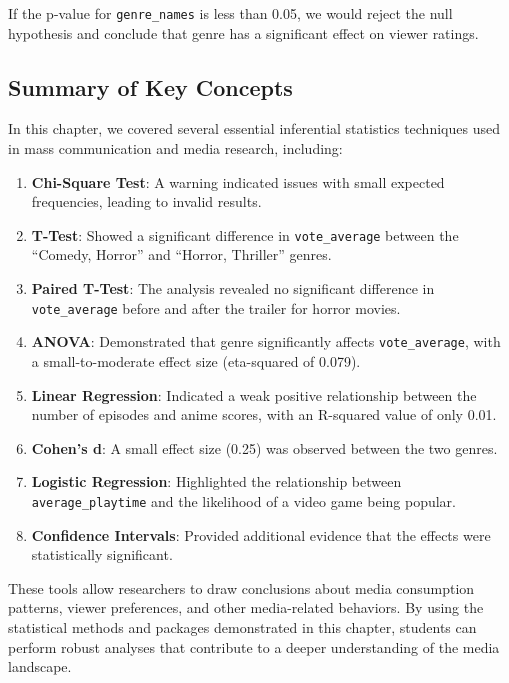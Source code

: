 \documentclass[
]{book}
\providecommand{\tightlist}{%
  \setlength{\itemsep}{0pt}\setlength{\parskip}{0pt}}
\begin{document}
If the p-value for \texttt{genre\_names} is less than 0.05, we would reject the null hypothesis and conclude that genre has a significant effect on viewer ratings.

\subsection*{Summary of Key Concepts}\label{summary-of-key-concepts}

In this chapter, we covered several essential inferential statistics techniques used in mass communication and media research, including:

\begin{enumerate}
\def\labelenumi{\arabic{enumi}.}
\tightlist
\item
  \textbf{Chi-Square Test}: A warning indicated issues with small expected frequencies, leading to invalid results.
\item
  \textbf{T-Test}: Showed a significant difference in \texttt{vote\_average} between the ``Comedy, Horror'' and ``Horror, Thriller'' genres.
\item
  \textbf{Paired T-Test}: The analysis revealed no significant difference in \texttt{vote\_average} before and after the trailer for horror movies.
\item
  \textbf{ANOVA}: Demonstrated that genre significantly affects \texttt{vote\_average}, with a small-to-moderate effect size (eta-squared of 0.079).
\item
  \textbf{Linear Regression}: Indicated a weak positive relationship between the number of episodes and anime scores, with an R-squared value of only 0.01.
\item
  \textbf{Cohen's d}: A small effect size (0.25) was observed between the two genres.
\item
  \textbf{Logistic Regression}: Highlighted the relationship between \texttt{average\_playtime} and the likelihood of a video game being popular.
\item
  \textbf{Confidence Intervals}: Provided additional evidence that the effects were statistically significant.
\end{enumerate}

These tools allow researchers to draw conclusions about media consumption patterns, viewer preferences, and other media-related behaviors. By using the statistical methods and packages demonstrated in this chapter, students can perform robust analyses that contribute to a deeper understanding of the media landscape.
\end{document}
